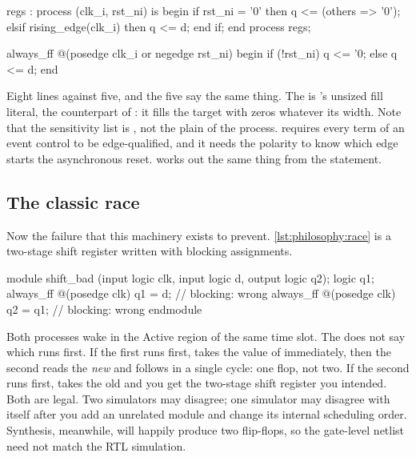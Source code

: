 \begin{rosetta}
\begin{rleft}
regs : process (clk_i, rst_ni) is
begin
  if rst_ni = '0' then
    q <= (others => '0');
  elsif rising_edge(clk_i) then
    q <= d;
  end if;
end process regs;
\end{rleft}
\begin{rright}
always_ff @(posedge clk_i or
            negedge rst_ni) begin
  if (!rst_ni) q <= '0;
  else         q <= d;
end
\end{rright}
\end{rosetta}

Eight lines against five, and the five say the same thing. The  is
\SV{}'s unsized fill literal, the counterpart of : it
fills the target with zeros whatever its width. Note that the \SV{} sensitivity
list is , not the plain  of the \VHDL{}
process. \SV{} requires every term of an  event control to be
edge-qualified, and it needs the polarity to know which edge starts the
asynchronous reset. \VHDL{} works out the same thing from the 
statement.

\subsection{The classic race}

Now the failure that this machinery exists to prevent.
\cref{lst:philosophy:race} is a two-stage shift register written with blocking
assignments.

\begin{svcode}[caption={A race. This design has two legal outcomes.},label={lst:philosophy:race}]
module shift_bad (input logic clk, input logic d, output logic q2);
  logic q1;
  always_ff @(posedge clk) q1 = d;    // blocking: wrong
  always_ff @(posedge clk) q2 = q1;   // blocking: wrong
endmodule
\end{svcode}

Both processes wake in the Active region of the same time slot. The \LRM{} does
not say which runs first. If the first runs first,  takes the value of
 immediately, then the second reads the \emph{new}  and
 follows  in a single cycle: one flop, not two. If the second
runs first,  takes the old  and you get the two-stage shift
register you intended. Both are legal. Two simulators may disagree; one
simulator may disagree with itself after you add an unrelated module and change
its internal scheduling order. Synthesis, meanwhile, will happily produce two
flip-flops, so the gate-level netlist need not match the RTL simulation.

